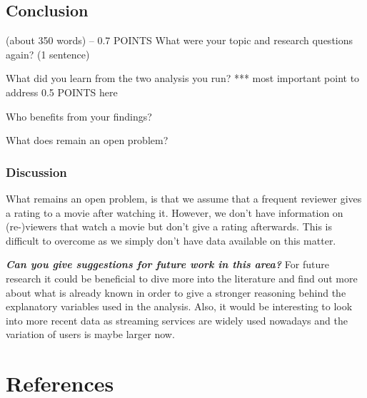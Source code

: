 \documentclass[
  english,
  man,floatsintext]{apa6}
\begin{document}
\hypertarget{conclusion}{%
\subsection{Conclusion}\label{conclusion}}

(about 350 words) -- 0.7 POINTS
What were your topic and research questions again? (1 sentence)

What did you learn from the two analysis you run? *** most important point to
address 0.5 POINTS here

Who benefits from your findings?

What does remain an open problem?

\hypertarget{discussion}{%
\subsubsection{Discussion}\label{discussion}}

What remains an open problem, is that we assume that a frequent reviewer gives a rating to a movie after watching it. However, we don't have information on (re-)viewers that watch a movie but don't give a rating afterwards. This is difficult to overcome as we simply don't have data available on this matter.

\textbf{\emph{Can you give suggestions for future work in this area?}}
For future research it could be beneficial to dive more into the literature and find out more about what is already known in order to give a stronger reasoning behind the explanatory variables used in the analysis. Also, it would be interesting to look into more recent data as streaming services are widely used nowadays and the variation of users is maybe larger now.

\newpage

\hypertarget{references}{%
\section{References}\label{references}}

\begingroup
\setlength{\parindent}{-0.5in}
\setlength{\leftskip}{0.5in}
\end{document}
